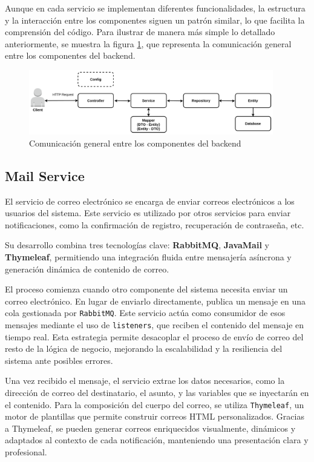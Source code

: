 Aunque en cada servicio se implementan diferentes funcionalidades, la estructura y la interacción entre los componentes siguen un patrón similar, lo que facilita la comprensión del código.
Para ilustrar de manera más simple lo detallado anteriormente, se muestra la figura \ref{fig:comm}, que representa la comunicación general entre los componentes del backend. 
\begin{figure}[H]
    \centering
    \includegraphics[width=0.95\textwidth]{figures/07_back.png}
    \caption{Comunicación general entre los componentes del backend}
    \label{fig:comm}
\end{figure}

\subsection{Mail Service}
El servicio de correo electrónico se encarga de enviar correos electrónicos a los usuarios del sistema. Este servicio es utilizado por otros servicios para enviar notificaciones, como la confirmación de registro, recuperación de contraseña, etc.

Su desarrollo combina tres tecnologías clave: \textbf{RabbitMQ}, \textbf{JavaMail} y \textbf{Thymeleaf}, permitiendo una integración fluida entre mensajería asíncrona y generación dinámica de contenido de correo.

El proceso comienza cuando otro componente del sistema necesita enviar un correo electrónico. En lugar de enviarlo directamente, publica un mensaje en una cola gestionada por \texttt{RabbitMQ}. Este servicio actúa como consumidor de esos mensajes mediante el uso de \texttt{listeners}, que reciben el contenido del mensaje en tiempo real. Esta estrategia permite desacoplar el proceso de envío de correo del resto de la lógica de negocio, mejorando la escalabilidad y la resiliencia del sistema ante posibles errores.

Una vez recibido el mensaje, el servicio extrae los datos necesarios, como la dirección de correo del destinatario, el asunto, y las variables que se inyectarán en el contenido. Para la composición del cuerpo del correo, se utiliza \texttt{Thymeleaf}, un motor de plantillas que permite construir correos HTML personalizados. Gracias a Thymeleaf, se pueden generar correos enriquecidos visualmente, dinámicos y adaptados al contexto de cada notificación, manteniendo una presentación clara y profesional.

